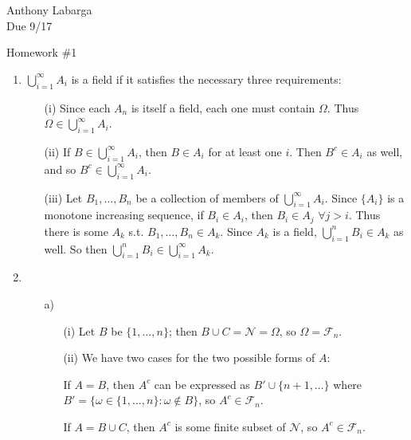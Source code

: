 \documentclass[12pt]{article}
\begin{document}
\begin{flushright}

Anthony Labarga\\
Due 9/17
\end{flushright}

\begin{center}
Homework \#1
\end{center}

\begin{enumerate}

\item $\bigcup_{i=1}^\infty A_i$ is a field if it satisfies the necessary three requirements:

\begin{itemize}
\item[(i)] Since each $A_n$ is itself a field, each one must contain $\Omega$. Thus $\Omega \in \bigcup^\infty_{i=1} A_i$.

\item[(ii)] If $B \in \bigcup^\infty_{i=1} A_i$, then $B \in A_i$ for at least one $i$. Then $B^c \in A_i$ as well, and so $B^c \in \bigcup^\infty_{i=1} A_i$.

\item[(iii)] Let $B_1,\dots,B_n$ be a collection of members of $ \bigcup^\infty_{i=1} A_i$. Since $\{A_i\}$ is a monotone increasing sequence, if $B_i \in A_i$, then $B_i \in A_j$ $\forall j>i$. Thus there is some $A_k$ s.t. $B_1,\dots,B_n \in A_k$. Since $A_k$ is a field, $\bigcup^n_{i=1} B_i \in A_k$ as well. So then $\bigcup^n_{i=1} B_i \in \bigcup^\infty_{i=1} A_k$.

\end{itemize}

\item

\begin{itemize}
\item[a)] 

\begin{itemize}
\item[(i)] Let $B$ be $\{1,\dots,n\}$; then $B \cup C = \mathcal{N} = \Omega$, so $\Omega=\mathcal{F}_n$.

\item[(ii)] We have two cases for the two possible forms of $A$:

If $A=B$, then $A^c$ can be expressed as $B' \cup\{n+1,\dots\}$ where $B'=\{\omega \in \{1,\dots,n\}: \omega \notin B\}$, so $A^c \in \mathcal{F}_n$.

If $A=B\cup C$, then $A^c$ is some finite subset of $\mathcal{N}$, so $A^c \in \mathcal{F}_n$.


\end{itemize}
\end{itemize}
\end{enumerate}
\end{document}
